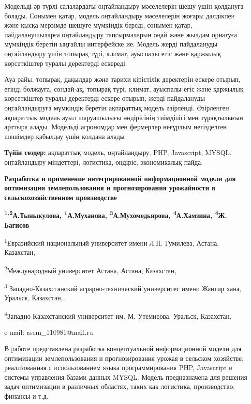 Модельді әр түрлі салалардағы оңтайландыру мәселелерін шешу үшін
қолдануға болады. Сонымен қатар, модель оңтайландыру мәселелерін жоғары
дәлдікпен және қысқа мерзімде шешуге мүмкіндік береді, сонымен қатар,
пайдаланушыларға оңтайландыру тапсырмаларын оңай және жылдам орнатуға
мүмкіндік беретін ыңғайлы интерфейске ие. Модель жерді пайдалануды
оңтайландыру үшін топырақ түрі, климат, ауыспалы егіс және қаржылық
көрсеткіштер туралы деректерді ескереді.

Ауа райы, топырақ, дақылдар және тарихи кірістілік деректерін ескере
отырып, егінді болжауға, сондай-ақ, топырақ түрі, климат, ауыспалы егіс
және қаржылық көрсеткіштер туралы деректерді ескере отырып, жерді
пайдалануды оңтайландыруға мүмкіндік беретін ақпараттық модель
әзірленді. Әзірленген ақпараттық модель ауыл шаруашылығы өндірісінің
тиімділігі мен тұрақтылығын арттыра алады. Модельді агрономдар мен
фермерлер неғұрлым негізделген шешімдер қабылдау үшін қолдана алады

{\bfseries Түйін сөздер:} ақпараттық модель, оңтайландыру, PHP, Javascript,
MYSQL, оңтайландыру міндеттері, логистика, өндіріс, экономикалық пайда.

{\bfseries Разработка и применение интегрированной информационной модели
для оптимизации землепользования и прогнозирования урожайности в
сельскохозяйственном производстве}

{\bfseries \textsuperscript{1,2}А.Тыныкулова,
\textsuperscript{1}А.Муханова, \textsuperscript{3}А.Мухомедьярова,
\textsuperscript{4}А.Хамзина, \textsuperscript{4}Ж. Багисов}

\textsuperscript{1}Евразийский национальный университет имени Л.Н.
Гумилева, Астана, Казахстан,

\textsuperscript{2}Международный университет Астана, Астана, Казахстан,

\textsuperscript{3} Западно-Казахстанский аграрно-технический
университет имени Жангир хана, Уральск, Казахстан,

\textsuperscript{4}Западно-Казахстанский университет им. М. Утемисова,
Уральск, Казахстан,

e-mail: asem\_110981@mail.ru

В работе представлена разработка концептуальной информационной модели
для оптимизации землепользования и прогнозирования урожая в сельском
хозяйстве, реализованная с использованием языка программирования PHP,
Javascript и системы управления базами данных MYSQL. Модель
предназначена для решения задач оптимизации в различных областях, таких
как логистика, производство, финансы и т.д.

